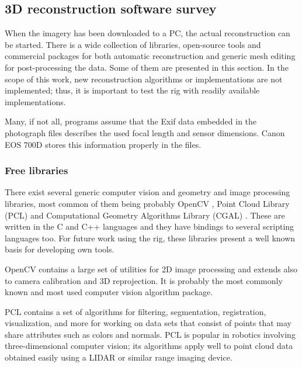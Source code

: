
\subsection{3D reconstruction software survey} %


When the imagery has been downloaded to a PC, the actual reconstruction can be started.
There is a wide collection of libraries, open-source tools and commercial packages for both automatic reconstruction and generic mesh editing for post-processing the data.
Some of them are presented in this section.
In the scope of this work, new reconstruction algorithms or implementations are not implemented;
thus, it is important to test the rig with readily available implementations.

Many, if not all, programs assume that the Exif data embedded in the photograph files describes the used focal length and sensor dimensions.
Canon EOS 700D stores this information properly in the files.


\subsubsection{Free libraries} %

There exist several generic computer vision and geometry and image processing libraries, most common of them being probably OpenCV \cite{opencv}, Point Cloud Library (PCL) \cite{pcl} and Computational Geometry Algorithms Library (CGAL) \cite{cgal}.
These are written in the C and C++ languages and they have bindings to several scripting languages too.
For future work using the rig, these libraries present a well known basis for developing own tools.

OpenCV contains a large set of utilities for 2D image processing and extends also to camera calibration and 3D reprojection.
It is probably the most commonly known and most used computer vision algorithm package.

PCL contains a set of algorithms for filtering, segmentation, registration, visualization, and more for working on data sets that consist of points that may share attributes such as colors and normals.
PCL is popular in robotics involving three-dimensional computer vision; its algorithms apply well to point cloud data obtained easily using a LIDAR or similar range imaging device.

